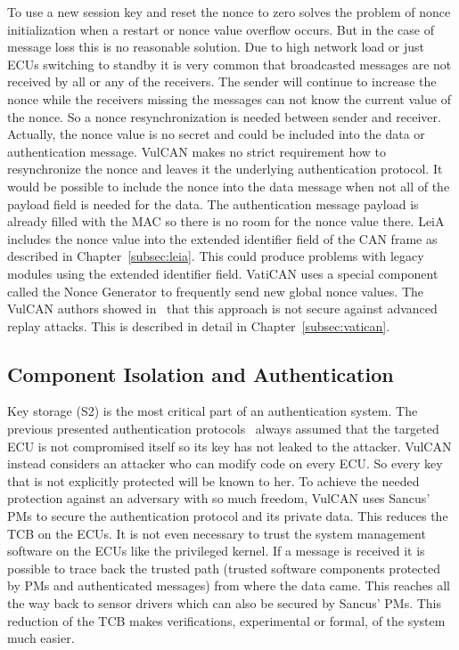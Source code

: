 To use a new session key and reset the nonce to zero solves the problem of nonce
initialization when a restart or nonce value overflow occurs. But in the case of
message loss this is no reasonable solution. Due to high network load or just
ECUs switching to standby it is very common that broadcasted messages are not
received by all or any of the receivers. The sender will continue to increase
the nonce while the receivers missing the messages can not know the current
value of the nonce. So a nonce resynchronization is needed between sender and
receiver. Actually, the nonce value is no secret and could be included into the
data or authentication message. VulCAN makes no strict requirement how to
resynchronize the nonce and leaves it the underlying authentication protocol. It
would be possible to include the nonce into the data message when not all of the
payload field is needed for the data. The authentication message payload is
already filled with the MAC so there is no room for the nonce value there. LeiA
includes the nonce value into the extended identifier field of the CAN frame as
described in Chapter~\ref{subsec:leia}. This could produce problems with legacy
modules using the extended identifier field. VatiCAN uses a special component
called the Nonce Generator to frequently send new global nonce values. The
VulCAN authors showed in~\cite{VanBulck2017} that this approach is not secure
against advanced replay attacks. This is described in detail in
Chapter~\ref{subsec:vatican}.

\subsection{Component Isolation and Authentication}\label{subsec:vulcan-component-isolation}

Key storage (S2) is the most critical part of an authentication system. The
previous presented authentication
protocols~\cite{Koscher2010,Nurnberger2016,Hazem2012,Radu2016,Bruni2014} always
assumed that the targeted ECU is not compromised itself so its key has not
leaked to the attacker. VulCAN instead considers an attacker who can modify code
on every ECU\@. So every key that is not explicitly protected will be known to
her. To achieve the needed protection against an adversary with so much freedom,
VulCAN uses Sancus' PMs to secure the authentication protocol and its private
data. This reduces the TCB on the ECUs. It is not even necessary to trust the
system management software on the ECUs like the privileged kernel. If a message
is received it is possible to trace back the trusted path (trusted software
components protected by PMs and authenticated messages) from where the data
came. This reaches all the way back to sensor drivers which can also be secured
by Sancus' PMs. This reduction of the TCB makes verifications, experimental or
formal, of the system much easier.


